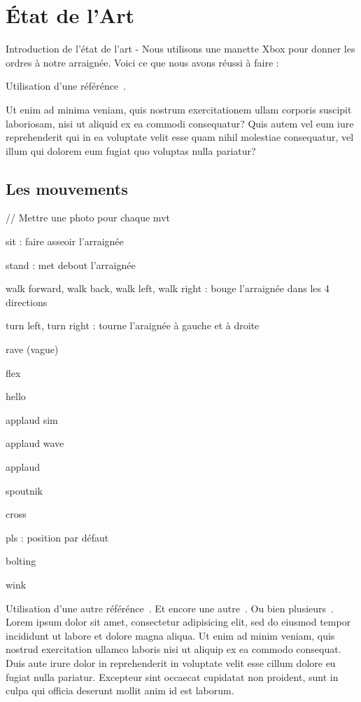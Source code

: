 	\chapter{État de l'Art}
	\thispagestyle{empty}
	
Introduction de l'état de l'art - Nous utilisons une manette Xbox pour donner les ordres à notre arraignée.
Voici ce que nous avons réussi à faire :

Utilisation d'une référénce~\cite{NOM00}.


Ut enim ad minima veniam, quis nostrum exercitationem ullam corporis suscipit laboriosam, nisi ut aliquid ex ea commodi consequatur? Quis autem vel eum iure reprehenderit qui in ea voluptate velit esse quam nihil molestiae consequatur, vel illum qui dolorem eum fugiat quo voluptas nulla pariatur?

		\section{Les mouvements}
		\label{les_mouvements}

// Mettre une photo pour chaque mvt		

sit : faire asseoir l'arraignée

stand : met debout l'arraignée

walk forward, walk back, walk left, walk right : bouge l'arraignée dans les 4 directions

turn left, turn right : tourne l'araignée à gauche et à droite

rave (vague)

flex

hello

applaud sim

applaud wave

applaud

spoutnik

cross

pls : position par défaut

bolting

wink

Utilisation d'une autre référénce~\cite{NOM05}. Et encore une autre~\cite{NOM12}. Ou bien plusieurs~\cite{WEB13, NOM09, NOM07}.
Lorem ipsum dolor sit amet, consectetur adipisicing elit, sed do eiusmod tempor incididunt ut labore et dolore magna aliqua. Ut enim ad minim veniam, quis nostrud exercitation ullamco laboris nisi ut aliquip ex ea commodo consequat. Duis aute irure dolor in reprehenderit in voluptate velit esse cillum dolore eu fugiat nulla pariatur. Excepteur sint occaecat cupidatat non proident, sunt in culpa qui officia deserunt mollit anim id est laborum.

